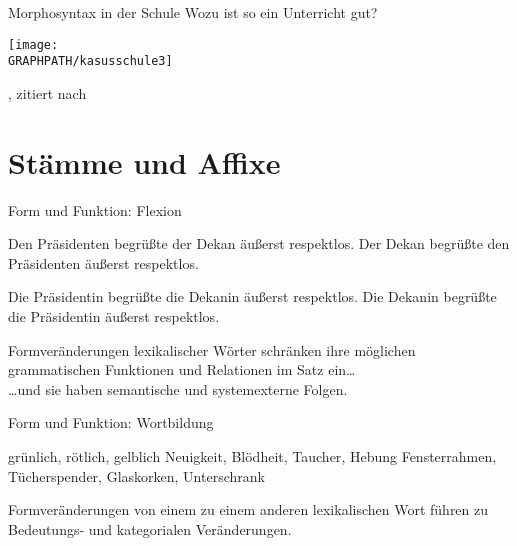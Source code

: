 \begin{frame}
  {Morphosyntax in der Schule}
  Wozu ist so ein Unterricht gut?
  \begin{center}
    \texttt{[image: \\GRAPHPATH/kasusschule3]}
  \end{center}
  \tiny \citet[36--37]{Gramzowemden2002}, zitiert nach \citet[257--258]{Bredel2013}
\end{frame}

\section{Stämme und Affixe}

\begin{frame}
  {Form und Funktion: Flexion}
  \pause
  \begin{exe}
    \ex
    \begin{xlist}
      \ex \alert{Den Präsidenten} begrüßte \alert{der Dekan} äußerst respektlos.
      \pause
      \ex \alert{Der Dekan} begrüßte \alert{den Präsidenten} äußerst respektlos.
    \end{xlist}
    \pause
    \ex
    \begin{xlist}
      \ex \alert{Die Präsidentin} begrüßte \alert{die Dekanin} äußerst respektlos.
      \pause
      \ex \alert{Die Dekanin} begrüßte \alert{die Präsidentin} äußerst respektlos.
    \end{xlist}
  \end{exe}
  \pause
  \Zeile
  Formveränderungen lexikalischer Wörter \alert{schränken ihre möglichen grammatischen Funktionen und Relationen im Satz ein}\dots\\
  \pause
  \Halbzeile
  \dots und sie haben semantische und systemexterne Folgen.

\end{frame}

\begin{frame}
  {Form und Funktion: Wortbildung}
  \pause
  \begin{exe}
    \ex grün\alert{lich}, röt\alert{lich}, gelb\alert{lich}
    \pause
    \ex Neu\alert{igkeit}, Blöd\alert{heit}, Tauch\alert{er}, Heb\alert{ung}
    \pause
    \ex Fenster\alert{rahmen}, Tücher\alert{spender}, Glas\alert{korken}, Unter\alert{schrank}
  \end{exe}
  \pause
  \Zeile
  Formveränderungen von einem zu einem anderen lexikalischen Wort führen zu Bedeutungs- und kategorialen Veränderungen.
\end{frame}

